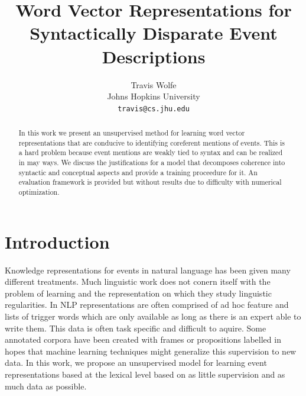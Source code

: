 \documentclass[11pt,letterpaper]{article}
\title{Word Vector Representations for \\
Syntactically Disparate Event Descriptions}
\author{Travis Wolfe\\
	    Johns Hopkins University \\
	    {\tt travis@cs.jhu.edu}
}
\date{}
\begin{document}
\maketitle
\begin{abstract}
In this work we present an unsupervised method for
learning word vector representations that are conducive to
identifying coreferent mentions of events.
This is a hard problem because event mentions are weakly
tied to syntax and can be realized in may ways.
We discuss the justifications for a model that decomposes
coherence into syntactic and conceptual aspects and
provide a training proceedure for it.
An evaluation framework is provided but without results due
to difficulty with numerical optimization.
\end{abstract}



\section{Introduction}
Knowledge representations for events in natural language has been given many different treatments.
Much linguistic work does not conern itself with the problem of learning and
the representation on which they study linguistic regularities.
In NLP representations are often comprised of ad hoc feature and lists of
trigger words which are only available as long as there is an expert able to write them.
This data is often task specific and difficult to aquire.
Some annotated corpora have been created with frames or propositions labelled
in hopes that machine learning techniques might generalize this supervision to new data.
In this work, we propose an unsupervised model for learning event representations
based at the lexical level based on as little supervision and as much data
as possible.
\end{document}
